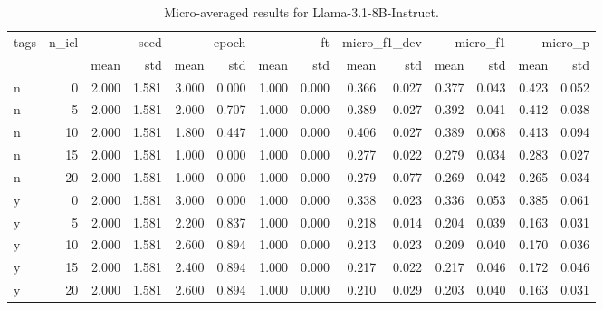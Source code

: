 \begin{table}
\caption{Micro-averaged results for Llama-3.1-8B-Instruct.}
\label{results_micro}
\begin{tabular}{lrrrrrrrrrrrrr}
\toprule
tags & n\_icl & \multicolumn{2}{r}{seed} & \multicolumn{2}{r}{epoch} & \multicolumn{2}{r}{ft} & \multicolumn{2}{r}{micro\_f1\_dev} & \multicolumn{2}{r}{micro\_f1} & \multicolumn{2}{r}{micro\_p} \\
 &  & mean & std & mean & std & mean & std & mean & std & mean & std & mean & std \\
\midrule
n & 0 & 2.000 & 1.581 & 3.000 & 0.000 & 1.000 & 0.000 & 0.366 & 0.027 & 0.377 & 0.043 & 0.423 & 0.052 \\
n & 5 & 2.000 & 1.581 & 2.000 & 0.707 & 1.000 & 0.000 & 0.389 & 0.027 & 0.392 & 0.041 & 0.412 & 0.038 \\
n & 10 & 2.000 & 1.581 & 1.800 & 0.447 & 1.000 & 0.000 & 0.406 & 0.027 & 0.389 & 0.068 & 0.413 & 0.094 \\
n & 15 & 2.000 & 1.581 & 1.000 & 0.000 & 1.000 & 0.000 & 0.277 & 0.022 & 0.279 & 0.034 & 0.283 & 0.027 \\
n & 20 & 2.000 & 1.581 & 1.000 & 0.000 & 1.000 & 0.000 & 0.279 & 0.077 & 0.269 & 0.042 & 0.265 & 0.034 \\
y & 0 & 2.000 & 1.581 & 3.000 & 0.000 & 1.000 & 0.000 & 0.338 & 0.023 & 0.336 & 0.053 & 0.385 & 0.061 \\
y & 5 & 2.000 & 1.581 & 2.200 & 0.837 & 1.000 & 0.000 & 0.218 & 0.014 & 0.204 & 0.039 & 0.163 & 0.031 \\
y & 10 & 2.000 & 1.581 & 2.600 & 0.894 & 1.000 & 0.000 & 0.213 & 0.023 & 0.209 & 0.040 & 0.170 & 0.036 \\
y & 15 & 2.000 & 1.581 & 2.400 & 0.894 & 1.000 & 0.000 & 0.217 & 0.022 & 0.217 & 0.046 & 0.172 & 0.046 \\
y & 20 & 2.000 & 1.581 & 2.600 & 0.894 & 1.000 & 0.000 & 0.210 & 0.029 & 0.203 & 0.040 & 0.163 & 0.031 \\
\bottomrule
\end{tabular}
\end{table}
